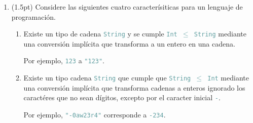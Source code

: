 \documentclass{article}
\newcommand{\tp}[1]{\textcolor{CadetBlue} {\texttt{#1}}}
\newcommand{\tb}[1]{\textcolor{RoyalPurple} {\textbf{#1}}}
\newcommand{\ti}[1]{\textcolor{RoyalPurple} {\textit{#1}}}
\newcommand{\pt}[1]{\textcolor{RoyalPurple}{(#1pt)}}
\begin{document}
\begin{enumerate}
\begin{verbatim}
N 3 = 22 + (f 3) + 37

N 4 = g 22 (f 4)

N 4 = 22 + (f 4) + 33 + (g y)

N x = h (f x) (44 - y) (g y)
        \end{verbatim}

        Defina la versión \tp{cps} de \tp{N}, denotada por \tp{cpsN}. Para esto,
        puede suponer definidas las versiones \tp{cps} de \tp{f, g, h},
        denotadas por \tp{cpsf, cpsg, cpsh}.

        \ti{Atención:} Las operaciones aritméticas deben permanecer sin cambios.
        Es decir, no se piden las versiones \tp{cps} de \tp{+, -}.

		\tb{Solución}
		\begin{verbatim}
cpsN 0 k = 17

cpsN 1 k = cpsf (1 + 13) (\v -> k v)

cpsN 2 k = k (22 + (2-3) + 2)

cpsN 3 k = cpsf 3 (\v -> k (22 + v + 37))

cpsN 4 k = cpsg 22 (\v1 -> cpsf 4 (\v2 -> k(v1 + v2))

cpsN 5 k = cpsf 4 (\v1 -> cpsg y (\v2 -> k(22 + v1 + 33+ v2)))

cpsN x k = cpsf x (\v1 -> cpsg y (\v2 -> cpsh v1 (44 -y) v2 (\v3 -> k v3)))
		\end{verbatim}

		$ $\\

        \item \pt{1.5} Considere las siguientes cuatro caracterísiticas para un
        lenguaje de programación.

        \begin{enumerate}
            \item Existe un tipo de cadena \tp{String} y se cumple
            \tp{Int $\leq$ String} mediante una conversión implícita que
            transforma a un entero en una cadena.

            Por ejemplo, \tp{123} a \tp{"123"}.

            \item Existe un tipo cadena \tp{String} que cumple que
            \tp{String $\leq$ Int} mediante una conversión implícita que
            transforma cadenas a enteros ignorado los caractéres que no sean
            dígitos, excepto por el caracter inicial \tp{-}.

            Por ejemplo, \tp{"}\tp{-0aw23r4"} corresponde a \tp{-234}.


\end{enumerate}
\end{enumerate}
\end{document}
